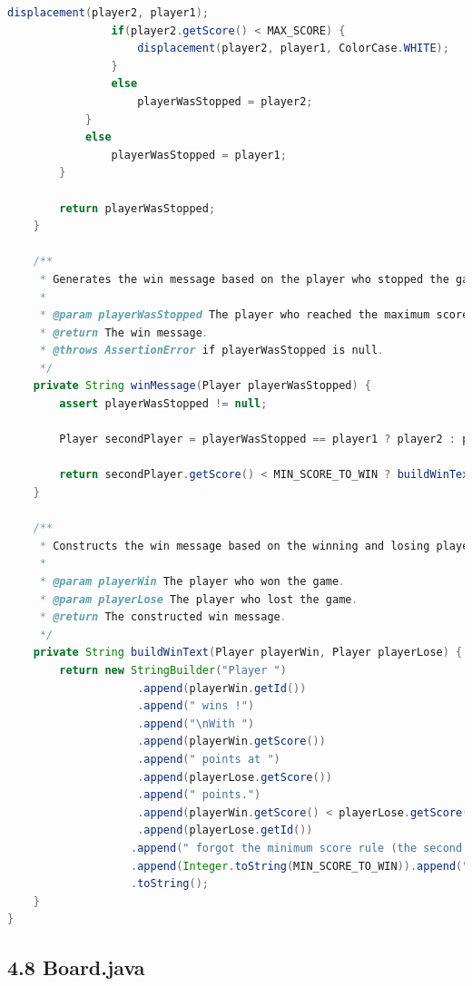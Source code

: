 \documentclass[a4paper,11pt]{article}
\begin{document}
\begin{lstlisting}[language=Java, breaklines=true]
                displacement(player2, player1);
                if(player2.getScore() < MAX_SCORE) {
                    displacement(player2, player1, ColorCase.WHITE);
                }
                else
                    playerWasStopped = player2;
            }
            else
                playerWasStopped = player1;
        }

        return playerWasStopped;
    }

    /**
     * Generates the win message based on the player who stopped the game.
     *
     * @param playerWasStopped The player who reached the maximum score.
     * @return The win message.
     * @throws AssertionError if playerWasStopped is null.
     */
    private String winMessage(Player playerWasStopped) {
        assert playerWasStopped != null;

        Player secondPlayer = playerWasStopped == player1 ? player2 : player1;

        return secondPlayer.getScore() < MIN_SCORE_TO_WIN ? buildWinText(secondPlayer, playerWasStopped) : buildWinText(playerWasStopped, secondPlayer);
    }

    /**
     * Constructs the win message based on the winning and losing players.
     *
     * @param playerWin The player who won the game.
     * @param playerLose The player who lost the game.
     * @return The constructed win message.
     */
    private String buildWinText(Player playerWin, Player playerLose) {
        return new StringBuilder("Player ")
                    .append(playerWin.getId())
                    .append(" wins !")
                    .append("\nWith ")
                    .append(playerWin.getScore())
                    .append(" points at ")
                    .append(playerLose.getScore())
                    .append(" points.")
                    .append(playerWin.getScore() < playerLose.getScore() ? new StringBuilder(" Player ")
                    .append(playerLose.getId())
                   .append(" forgot the minimum score rule (the second player need a minimum above or equals to ")
                   .append(Integer.toString(MIN_SCORE_TO_WIN)).append(").") : "")
                   .toString();
    }
}


\end{lstlisting}
\newpage

\subsection{4.8 Board.java}
\end{document}
